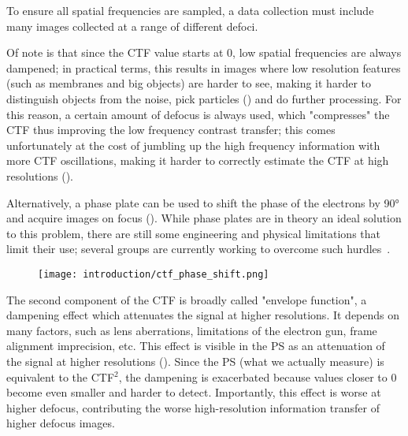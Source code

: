 To ensure all spatial frequencies are sampled, a data collection must include many images collected at a range of different defoci.

Of note is that since the CTF value starts at 0, low spatial frequencies are always dampened; in practical terms, this results in images where low resolution features (such as membranes and big objects) are harder to see, making it harder to distinguish objects from the noise, pick particles () and do further processing.
For this reason, a certain amount of defocus is always used, which "compresses" the CTF thus improving the low frequency contrast transfer; this comes unfortunately at the cost of jumbling up the high frequency information with more CTF oscillations, making it harder to correctly estimate the CTF at high resolutions ().

Alternatively, a phase plate can be used to shift the phase of the electrons by 90° and acquire images on focus ().
While phase plates are in theory an ideal solution to this problem, there are still some engineering and physical limitations that limit their use; several groups are currently working to overcome such hurdles~\cite{danevExpandingBoundariesCryoEM2017,schwartzLaserPhasePlate2019}.

\begin{figure}
    \centering
    \texttt{[image: introduction/ctf\_phase\_shift.png]}
    \label{fig:em_ctf_phase_shift}
\end{figure}

The second component of the CTF is broadly called "envelope function", a dampening effect which attenuates the signal at higher resolutions.
It depends on many factors, such as lens aberrations, limitations of the electron gun, frame alignment imprecision, etc.
This effect is visible in the PS as an attenuation of the signal at higher resolutions ().
Since the PS (what we actually measure) is equivalent to the CTF$^2$, the dampening is exacerbated because values closer to 0 become even smaller and harder to detect.
Importantly, this effect is worse at higher defocus, contributing the worse high-resolution information transfer of higher defocus images.

